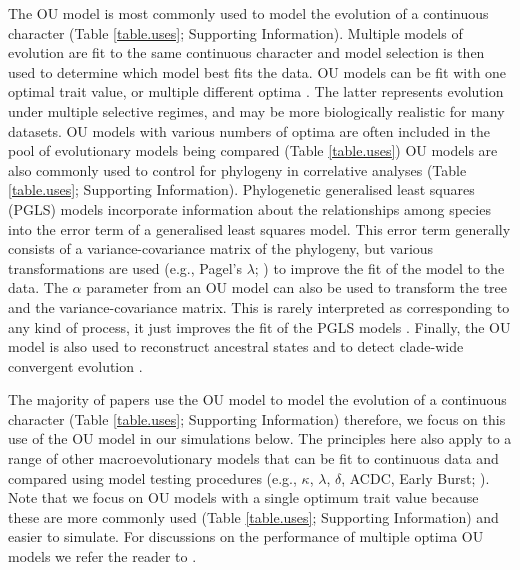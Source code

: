 \documentclass[a4paper,12pt]{article}
\begin{document}
  The OU model is most commonly used to model the evolution of a continuous character (Table \ref{table.uses}; Supporting Information). 
  Multiple models of evolution \citep[e.g., Brownian motion, OU, Early burst etc.;][]{Harmon:2010aa,cooper2010body} are fit to the same continuous character and model selection is then used to determine which model best fits the data.  
  OU models can be fit with one optimal trait value, or multiple different optima \citep{Butler:2004aa,beaulieu2012modeling}. 
  The latter represents evolution under multiple selective regimes, and may be more biologically realistic for many datasets. 
  OU models with various numbers of optima are often included in the pool of evolutionary models being compared \citep[e.g.,][]{christin2013anatomical}(Table \ref{table.uses})
  OU models are also commonly used to control for phylogeny in correlative analyses (Table \ref{table.uses}; Supporting Information).  
  Phylogenetic generalised least squares (PGLS) models incorporate information about the relationships among species into the error term of a generalised least squares model. 
  This error term generally consists of a variance-covariance matrix of the phylogeny, but various transformations are used (e.g., Pagel's $\lambda$; \citealp{Pagel:1997aa}) to improve the fit of the model to the data. 
  The $\alpha$ parameter from an OU model can also be used to transform the tree and the variance-covariance matrix.
  This is rarely interpreted as corresponding to any kind of process, it just improves the fit of the PGLS models \citep[e.g.,][]{blankers2012ecological}. 
  Finally, the OU model is also used to reconstruct ancestral states \citep{martins1999estimation} and to detect clade-wide convergent evolution \citep{ingram2013surface}. 

  The majority of papers use the OU model to model the evolution of a continuous character (Table \ref{table.uses}; Supporting Information) therefore, we focus on this use of the OU model in our simulations below. 
  The principles here also apply to a range of other macroevolutionary models that can be fit to continuous data and compared using model testing procedures (e.g., $\kappa$, $\lambda$, $\delta$, ACDC, Early Burst; \citealp{Pagel:1997aa,Pagel:1999aa,Blomberg:2003aa,Harmon:2008aa}).
  Note that we focus on OU models with a single optimum trait value because these are more commonly used (Table \ref{table.uses}; Supporting Information) and easier to simulate.  For discussions on the performance of multiple optima OU models we refer the reader to \citep{beaulieu2012ouwie}.
\end{document}
